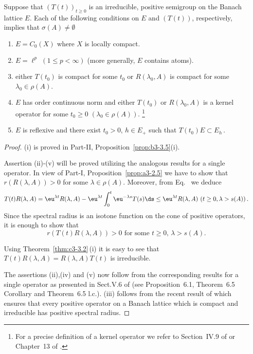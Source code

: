 \begin{theorem}\label{thm:c3-3.7}

Suppose that $(T(t))_{t\geq 0}$ is an irreducible, positive semigroup on the Banach lattice $E$.
Each of the following conditions on $E$ and $(T(t))$, respectively, implies that $\sigma(A) \neq \emptyset$
\begin{enumerate}[\upshape (i)]
	\item
	$E = C_{0}(X)$ where $X$ is locally compact.

	\item 
	$E = \ell^{p}$ $(1 \leq p < \infty)$ (more generally, $E$ contains atoms).

	\item either $T(t_{0})$ is compact for some $t_{0}$ or $R(\lambda_{0},A)$ is compact for some $\lambda_{0} \in \rho(A)$.

	\item 
	$E$ has order continuous norm and either $T(t_{0})$ or $R(\lambda_{0},A)$ is a kernel operator for some $t_{0} \geq 0$ $(\lambda_{0} \in \rho(A))$. 	
	\footnote[1]{For a precise definition of a kernel operator we refer to Section~IV.9 of \textcite{schaefer:1974} or Chapter~13 of \textcite{zaanen:1983}.}

	\item 
	$E$ is reflexive and there exist $t_{0} > 0$, $h \in E_{+}$ such that $T(t_{0})E \subset E_{h}$\,.
\end{enumerate}
\end{theorem}
\begin{proof}
	(i) is proved in Part-II, Proposition~\ref{prop:b3-3.5}(i).
	
	Assertion (ii)-(v) will be proved utilizing the analogous results for a single operator.
	In view of Part-I, Proposition~\ref{prop:a3-2.5} we have to show that $r(R(\lambda,A)) > 0$ for some $\lambda \in \rho(A)$.
	Moreover, from Eq.~ we deduce
	\begin{align*}
		T(t)R(\lambda,A) = \eu^{\lambda t}R(\lambda,A) - \eu^{\lambda t}\int_{0}^{t} \eu^{-\lambda s}T(s)\ds \leq \eu^{\lambda t}R(\lambda,A) \ (t\geq 0, \lambda>s(A))\,.
	\end{align*}
	Since the spectral radius is an isotone function on the cone of positive operators, it is enough to show that
	\begin{equation}\label{eq:c3-3.12}
		r(T(t)R(\lambda,A)) > 0 \text{ for some } t \geq 0,\, \lambda > s(A).
	\end{equation}
	
	Using Theorem~\ref{thm:c3-3.2}\,(i) it is easy to see that $T(t)R(\lambda,A) = R(\lambda,A)T(t)$ is irreducible.
	
	The assertions (ii),(iv) and (v) now follow from the corresponding results for a single operator as presented in Sect.V.6 of \textcite{schaefer:1974} (see Proposition~6.1, Theorem~6.5 Corollary and Theorem~6.5 l.c.).
	(iii) follows from the recent result of \textcite{depagter:1986} which ensures that every positive operator on a Banach lattice which is compact and irreducible has positive spectral radius.
\end{proof}
